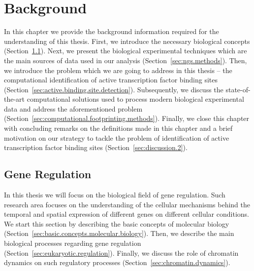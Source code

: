 \chapter{Background}
\label{cha:background}

\graphicspath{{chapter2/figs/}}

In this chapter we provide the background information required for the understanding of this thesis. First, we introduce the necessary biological concepts (Section~\ref{sec:gene.regulation}). Next, we present the biological experimental techniques which are the main sources of data used in our analysis (Section~\ref{sec:ngs.methods}). Then, we introduce the problem which we are going to address in this thesis -- the computational identification of active transcription factor binding sites (Section~\ref{sec:active.binding.site.detection}). Subsequently, we discuss the state-of-the-art computational solutions used to process modern biological experimental data and address the aforementioned problem (Section~\ref{sec:computational.footprinting.methods}). Finally, we close this chapter with concluding remarks on the definitions made in this chapter and a brief motivation on our strategy to tackle the problem of identification of active transcription factor binding sites (Section~\ref{sec:discussion.2}).

\section{Gene Regulation}
\label{sec:gene.regulation}

In this thesis we will focus on the biological field of gene regulation. Such research area focuses on the understanding of the cellular mechanisms behind the temporal and spatial expression of different genes on different cellular conditions. We start this section by describing the basic concepts of molecular biology (Section~\ref{sec:basic.concepts.molecular.biology}). Then, we describe the main biological processes regarding gene regulation (Section~\ref{sec:eukaryotic.regulation}). Finally, we discuss the role of chromatin dynamics on such regulatory processes (Section~\ref{sec:chromatin.dynamics}).

